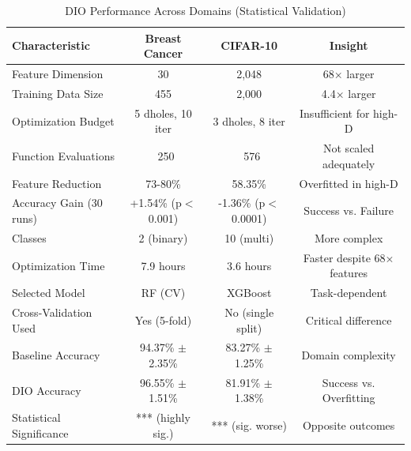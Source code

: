 \documentclass[12pt, a4paper]{article}
\begin{document}
\begin{table}[H]
    \centering
    \caption{DIO Performance Across Domains (Statistical Validation)}
    \begin{tabular}{lccc}
        \toprule
        \textbf{Characteristic} & \textbf{Breast Cancer} & \textbf{CIFAR-10} & \textbf{Insight} \\
        \midrule
        Feature Dimension & 30 & 2,048 & 68× larger \\
        Training Data Size & 455 & 2,000 & 4.4× larger \\
        Optimization Budget & 5 dholes, 10 iter & 3 dholes, 8 iter & Insufficient for high-D \\
        Function Evaluations & ~250 & ~576 & Not scaled adequately \\
        Feature Reduction & 73-80\% & 58.35\% & Overfitted in high-D \\
        Accuracy Gain (30 runs) & +1.54\% (p$<$0.001) & -1.36\% (p$<$0.0001) & Success vs. Failure \\
        Classes & 2 (binary) & 10 (multi) & More complex \\
        Optimization Time & 7.9 hours & 3.6 hours & Faster despite 68× features \\
        Selected Model & RF (CV) & XGBoost & Task-dependent \\
        Cross-Validation Used & Yes (5-fold) & No (single split) & Critical difference \\
        Baseline Accuracy & 94.37\% $\pm$ 2.35\% & 83.27\% $\pm$ 1.25\% & Domain complexity \\
        DIO Accuracy & 96.55\% $\pm$ 1.51\% & 81.91\% $\pm$ 1.38\% & Success vs. Overfitting \\
        Statistical Significance & *** (highly sig.) & *** (sig. worse) & Opposite outcomes \\
        \bottomrule
    \end{tabular}
\end{table}
\end{document}
